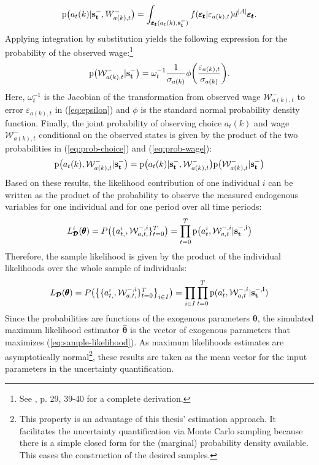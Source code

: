 \noindent
\begin{align} \label{eq:prob-choice}
\text{p}\big(a_t(k) | \bold{s_t^-},W^{-}_{a(k),t}\big) = \int_{\pmb{\varepsilon_t}(a_t(k),\bold{s_t^-})} f(\pmb{\varepsilon_t}|\varepsilon_{a(k),t}) d^{|A|} \pmb{\varepsilon_t}.
\end{align}
Applying integration by substitution yields the following expression for the probability of the observed wage:\footnote{See \cite{Raabe.2019}, p. 29, 39-40 for a complete derivation.}
\begin{align} \label{eq:prob-wage}
\text{p}\big(\mathcal{W}^{-}_{a(k),t} | \bold{s_t^-}\big) = \omega_t^{-1} \frac{1}{\sigma_{a(k)}} \phi\bigg(\frac{\varepsilon_{a(k),t}}{\sigma_{a(k)}}\bigg).
\end{align}
Here, $\omega_t^{-1}$ is the Jacobian of the transformation from observed wage $\mathcal{W}^{-}_{a(k),t}$ to error $\varepsilon_{a(k),t}$ in (\ref{eq:epsilon}) and $\phi$ is the standard normal probability density function.
Finally, the joint probability of observing choice $a_t(k)$ and wage $\mathcal{W}^{-}_{a(k),t}$ conditional on the observed states is given by the product of the two probabilities in (\ref{eq:prob-choice}) and (\ref{eq:prob-wage}):
\begin{align}
\text{p}\big(a_t(k),\mathcal{W}^{-}_{a(k),t}|\bold{s_t^-}\big) = \text{p}\big(a_t(k)|\bold{s_t^-}, \mathcal{W}^{-}_{a(k),t}\big)\text{p}\big(\mathcal{W}^{-}_{a(k),t}|\bold{s_t^-}\big)
\end{align}
Based on these results, the likelihood contribution of one individual $i$ can be written as the product of the probability to observe the measured endogenous variables for one individual and for one period over all time periods:
\begin{align}
L^{i}_{\pmb{\mathcal{D}}}(\pmb{\theta}) = P\big(\{a_{t,}^{i},\mathcal{W}^{-,i}_{a,t,}\}_{t=0}^T\big) = \prod_{t=0}^{T} \text{p}\big(a_t^{i},\mathcal{W}_{a,t}^{-,i}|\bold{s_t^{-,i}}\big)
\end{align}
Therefore, the sample likelihood is given by the product of the individual likelihoods over the whole sample of individuals:
\begin{align} \label{eq:sample-likelihood}
L_{\pmb{\mathcal{D}}}(\pmb{\theta}) = P\big(\big\{\{a_{t,}^{i},\mathcal{W}^{-,i}_{a,t,}\}_{t=0}^T\big\}_{i \in I}\big) = \prod_{i \in I}\prod_{t=0}^{T} \text{p}(a_t^{i},\mathcal{W}_{a,t}^{-,i}|\bold{s_t^{-,i})}
\end{align}
Since the probabilities are functions of the exogenous parameters $\pmb{\theta}$, the simulated maximum likelihood estimator $\pmb{\hat{\theta}}$ is the vector of exogenous parameters that maximizes (\ref{eq:sample-likelihood}). As maximum likelihoods estimates are asymptotically normal\footnote{This property is an advantage of this thesis' estimation approach. It facilitates the uncertainty quantification via Monte Carlo sampling because there is a simple closed form for the (marginal) probability density available. This eases the construction of the desired samples.}, these results are taken as the mean vector for the input parameters in the uncertainty quantification.

